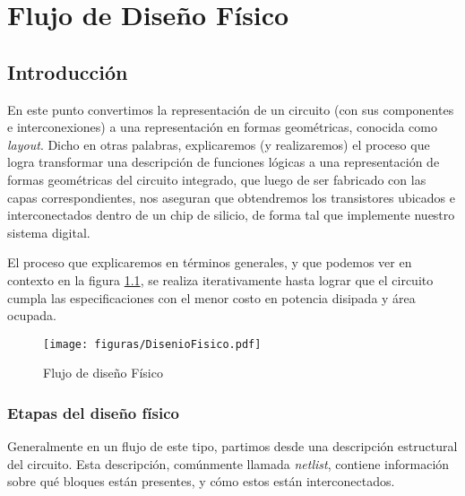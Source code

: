 
\chapter{Flujo de Diseño Físico}
\section{Introducción}

En este punto convertimos la representación de un circuito (con sus componentes e interconexiones) a una representación en formas geométricas, conocida como \emph{layout}. Dicho en otras palabras, explicaremos (y realizaremos) el proceso que logra transformar una descripción de funciones lógicas a una representación de formas geométricas del circuito integrado, que luego de ser fabricado con las capas correspondientes, nos aseguran que obtendremos los transistores ubicados e interconectados dentro de un chip de silicio, de forma tal que implemente nuestro sistema digital.

El proceso que explicaremos en términos generales, y que podemos ver en contexto en la figura \ref{fig:diseñoFísico}, se realiza iterativamente hasta lograr que el circuito cumpla las especificaciones con el menor costo en potencia disipada y área ocupada.

\begin{figure}[h]
\centering
\texttt{[image: figuras/DisenioFisico.pdf]}
  \caption{Flujo de diseño Físico}
  \label{fig:diseñoFísico}
\end{figure}

\subsection{Etapas del diseño físico}\label{etapasDiseñoFisico}
Generalmente en un flujo de este tipo, partimos desde una descripción estructural del circuito. Esta descripción, comúnmente llamada \emph{netlist}, contiene información sobre qué bloques están presentes, y cómo estos están interconectados.



